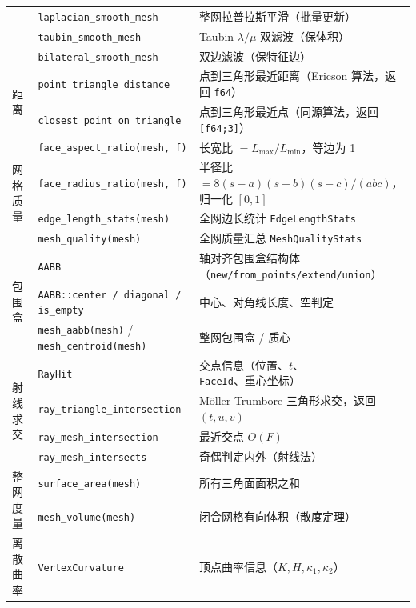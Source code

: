 \documentclass[11pt,a4paper]{article}
\begin{document}
\begin{center}
\begin{tabular}{@{}lll@{}}
    & \texttt{laplacian\_smooth\_mesh}       & 整网拉普拉斯平滑（批量更新） \\
    & \texttt{taubin\_smooth\_mesh}          & Taubin $\lambda/\mu$ 双滤波（保体积） \\
    & \texttt{bilateral\_smooth\_mesh}       & 双边滤波（保特征边） \\
  \midrule
  \multirow{2}{*}{距离}
    & \texttt{point\_triangle\_distance}     & 点到三角形最近距离（Ericson 算法，返回 \texttt{f64}） \\
    & \texttt{closest\_point\_on\_triangle}  & 点到三角形最近点（同源算法，返回 \texttt{[f64;3]}） \\
  \midrule
  \multirow{4}{*}{网格质量}
    & \texttt{face\_aspect\_ratio(mesh, f)}  & 长宽比 $= L_{\max} / L_{\min}$，等边为 1 \\
    & \texttt{face\_radius\_ratio(mesh, f)}  & 半径比 $= 8(s{-}a)(s{-}b)(s{-}c)/(abc)$，归一化 $[0,1]$ \\
    & \texttt{edge\_length\_stats(mesh)}     & 全网边长统计 \texttt{EdgeLengthStats} \\
    & \texttt{mesh\_quality(mesh)}           & 全网质量汇总 \texttt{MeshQualityStats} \\
  \midrule
  \multirow{3}{*}{包围盒}
    & \texttt{AABB}                          & 轴对齐包围盒结构体（\texttt{new/from\_points/extend/union}） \\
    & \texttt{AABB::center / diagonal / is\_empty} & 中心、对角线长度、空判定 \\
    & \texttt{mesh\_aabb(mesh)} / \texttt{mesh\_centroid(mesh)} & 整网包围盒 / 质心 \\
  \midrule
  \multirow{4}{*}{射线求交}
    & \texttt{RayHit}                                 & 交点信息（位置、$t$、\texttt{FaceId}、重心坐标） \\
    & \texttt{ray\_triangle\_intersection}            & Möller-Trumbore 三角形求交，返回 $(t,u,v)$ \\
    & \texttt{ray\_mesh\_intersection}                & 最近交点 $O(F)$ \\
    & \texttt{ray\_mesh\_intersects}                  & 奇偶判定内外（射线法） \\
  \midrule
  \multirow{2}{*}{整网度量}
    & \texttt{surface\_area(mesh)}                    & 所有三角面面积之和 \\
    & \texttt{mesh\_volume(mesh)}                     & 闭合网格有向体积（散度定理） \\
  \midrule
  \multirow{4}{*}{离散曲率}
    & \texttt{VertexCurvature}                        & 顶点曲率信息（$K, H, \kappa_1, \kappa_2$） \\

\end{tabular}
\end{center}
\end{document}
